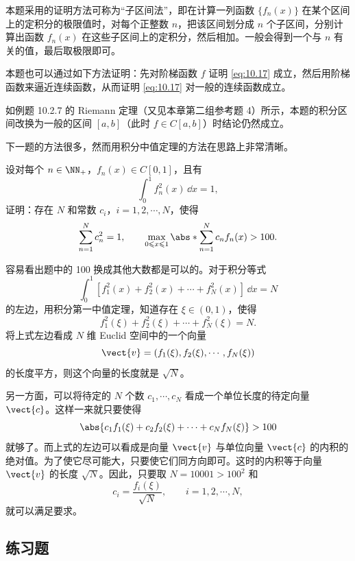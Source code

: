 \begin{xremark}
本题采用的证明方法可称为“子区间法”，即在计算一列函数 $\{f_n(x)\}$ 在某个区间上的定积分的极限值时，对每个正整数 $n$，把该区间划分成 $n$ 个子区间，分别计算出函数 $f_n(x)$ 在这些子区间上的定积分，然后相加。一般会得到一个与 $n$ 有关的值，最后取极限即可。
\end{xremark}

\begin{xremark}
本题也可以通过如下方法证明：先对阶梯函数 $f$ 证明 \eqref{eq:10.17} 成立，然后用阶梯函数来逼近连续函数，从而证明 \eqref{eq:10.17} 对一般的连续函数成立。
\end{xremark}

\begin{xremark}
如例题 10.2.7 的 Riemann 定理（又见本章第二组参考题 4）所示，本题的积分区间改换为一般的区间 $[a,b]$（此时 $f\in C[a,b]$）时结论仍然成立。
\end{xremark}

下一题的方法很多，然而用积分中值定理的方法在思路上非常清晰。

\begin{xexample}[10.4.13]
设对每个 $n\in\NN_+$，$f_n(x)\in C[0,1]$，且有
\[
  \int_0^1 f_n^2(x)\,\dd x=1,
\]
证明：存在 $N$ 和常数 $c_i$，$i=1,2,\cdots,N$，使得
\[
  \sum_{n=1}^N c_n^2=1,
  \qquad
  \max_{0\leqslant x\leqslant1}\abs*{\sum_{n=1}^N c_nf_n(x)}>100.
\]
\end{xexample}
\begin{xsolution}
容易看出题中的 100 换成其他大数都是可以的。对于积分等式
\[
  \int_0^1[f_1^2(x)+f_2^2(x)+\cdots+f_N^2(x)]\,\dd x=N
\]
的左边，用积分第一中值定理，知道存在 $\xi\in(0,1)$，使得
\[
  f_1^2(\xi)+f_2^2(\xi)+\cdots+f_N^2(\xi)=N.
\]
将上式左边看成 $N$ 维 Euclid 空间中的一个向量
\[
  \vect{v}=(f_1(\xi),f_2(\xi),\cdots,f_N(\xi))
\]
的长度平方，则这个向量的长度就是 $\sqrt N$。

另一方面，可以将待定的 $N$ 个数 $c_1,\cdots,c_N$ 看成一个单位长度的待定向量 $\vect{c}$。这样一来就只要使得
\[
  \abs{c_1f_1(\xi)+c_2f_2(\xi)+\cdots+c_Nf_N(\xi)}>100
\]
就够了。而上式的左边可以看成是向量 $\vect{v}$ 与单位向量 $\vect{c}$ 的内积的绝对值。为了使它尽可能大，只要使它们同方向即可。这时的内积等于向量 $\vect{v}$ 的长度 $\sqrt N$。因此，只要取 $N=10001>100^2$ 和
\[
  c_i=\frac{f_i(\xi)}{\sqrt N},\qquad i=1,2,\cdots,N,
\]
就可以满足要求。
\end{xsolution}

\subsection{练习题}

